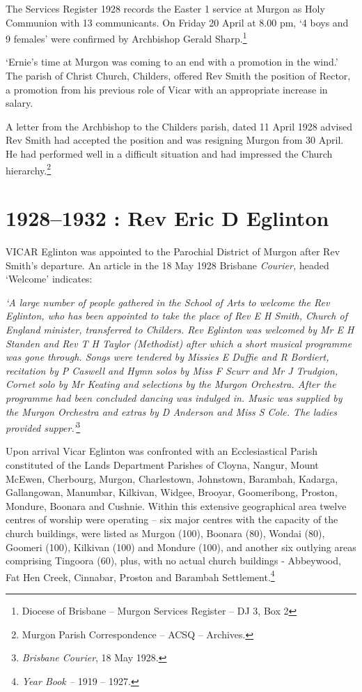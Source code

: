The Services Register 1928 records the Easter 1 service at Murgon as Holy Communion with 13 communicants. On Friday 20 April at 8.00 pm, `4 boys and 9 females' were confirmed by Archbishop Gerald Sharp.\footnote{Diocese of Brisbane -- Murgon Services Register -- DJ 3, Box 2}


`Ernie's time at Murgon was coming to an end with a promotion in the wind.' The parish of Christ Church, Childers, offered Rev Smith the position of Rector, a promotion from his previous role of Vicar with an appropriate increase in salary.



A letter from the Archbishop to the Childers parish, dated 11 April 1928 advised Rev Smith had accepted the position and was resigning Murgon from 30 April. He had performed well in a difficult situation and had impressed the Church hierarchy.\footnote{Murgon Parish Correspondence -- ACSQ -- Archives.}


\balance


\printendnotes[custom]
\setcounter{endnote}{0}
\chapter{1928--1932 : Rev Eric D Eglinton}
\nobalance


\lettrine[lines=3]{V}{ICAR}
 Eglinton was appointed to the Parochial District of Murgon after Rev Smith's departure. An article in the 18 May 1928 Brisbane \emph{Courier,} headed `Welcome' indicates:

\emph{`A large number of people gathered in the School of Arts to welcome the Rev Eglinton, who has been appointed to take the place of Rev E H Smith, Church of England minister, transferred to Childers. Rev Eglinton was welcomed by Mr E H Standen and Rev T H Taylor (Methodist) after which a short musical programme was gone through. Songs were tendered by Missies E Duffie and R Bordiert, recitation by P Caswell and Hymn solos by Miss F Scurr and Mr J Trudgion, Cornet solo by Mr Keating and selections by the Murgon Orchestra. After the programme had been concluded dancing was indulged in. Music was supplied by the Murgon Orchestra and extras by D Anderson and Miss S Cole. The ladies provided supper.'}\footnote{\emph{Brisbane Courier}, 18 May 1928.}


Upon arrival Vicar Eglinton was confronted with an Ecclesiastical Parish constituted of the Lands Department Parishes of Cloyna, Nangur, Mount McEwen, Cherbourg, Murgon, Charlestown, Johnstown, Barambah, Kadarga, Gallangowan, Manumbar, Kilkivan, Widgee, Brooyar, Goomeribong, Proston, Mondure, Boonara and Cushnie. Within this extensive geographical area twelve centres of worship were operating -- six major centres with the capacity of the church buildings, were listed as Murgon (100), Boonara (80), Wondai (80), Goomeri (100), Kilkivan (100) and Mondure (100), and another six outlying areas comprising Tingoora (60), plus, with no actual church buildings - Abbeywood, Fat Hen Creek, Cinnabar, Proston and Barambah Settlement.\footnote{\emph{Year Book --} 1919 -- 1927.}


